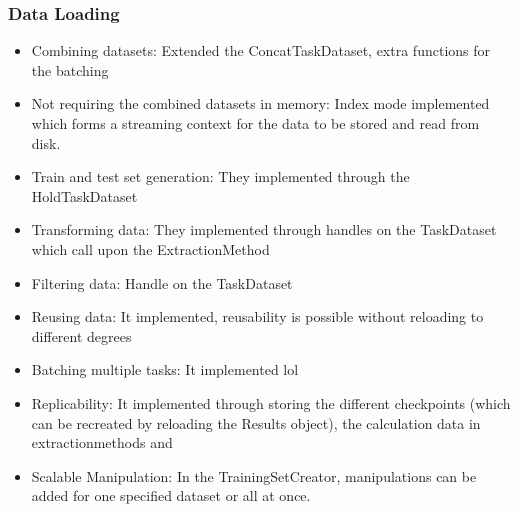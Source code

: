 \subsubsection{Data Loading}
\begin{itemize}
	\item Combining datasets: Extended the ConcatTaskDataset, extra functions for the batching
	\item Not requiring the combined datasets in memory:  Index mode implemented which forms a streaming context for the data to be stored and read from disk.
	\item Train and test set generation: They implemented through the HoldTaskDataset
	\item Transforming data: They implemented through handles on the TaskDataset which call upon the ExtractionMethod
	\item Filtering data: Handle on the TaskDataset
	\item Reusing data: It implemented, reusability is possible without reloading to different degrees
	\item Batching multiple tasks: It implemented lol
	\item Replicability: It implemented through storing the different checkpoints (which can be recreated by reloading the Results object), the calculation data in extractionmethods and 
	\item Scalable Manipulation: In the TrainingSetCreator, manipulations can be added for one specified dataset or all at once.
\end{itemize}
